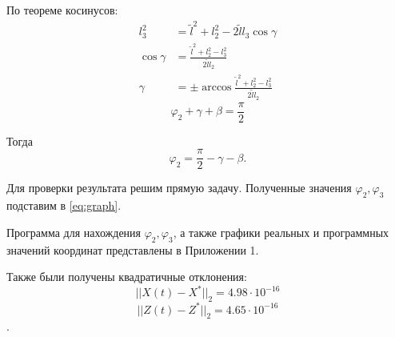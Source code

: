 По теореме косинусов:
\begin{align*}
    l_3^2 &= \tilde l^2+l_2^2-2\tilde l l_3 \cos\gamma \\
    \cos\gamma &= \frac{\tilde l^2+l_2^2-l_3^2}{2\tilde l l_2} \\
    \gamma &=\pm \arccos\frac{\tilde l^2+l_2^2-l_3^2}{2\tilde l l_2}
\end{align*}
$$\varphi_2+\gamma+\beta=\frac\pi 2$$ 

Тогда $$\varphi_2=\frac \pi 2 -\gamma-\beta.$$

Для проверки результата решим прямую задачу. Полученные значения $\varphi_2,\varphi_3$ подставим в \eqref{eq:graph}. 

Программа для нахождения $\varphi_2,\varphi_3$, а также графики реальных и программных значений координат представлены в Приложении 1.

Также были получены квадратичные отклонения: 
$$||X(t)-X^*||_2=4.98\cdot10^{-16}$$
$$||Z(t)-Z^*||_2=4.65\cdot10^{-16}$$.